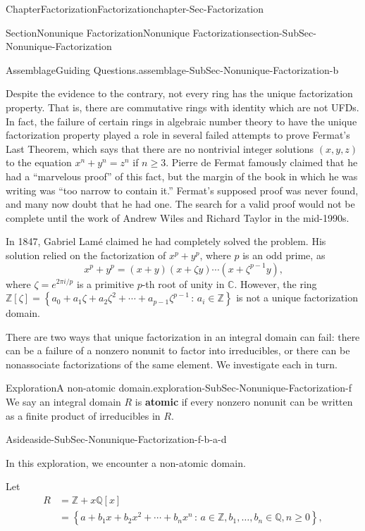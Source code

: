 \documentclass[oneside,10pt,]{book}
\newcommand{\terminology}[1]{\textbf{#1}}
\numberwithin{equation}{section}
\renewcommand{\ge}{\geqslant}
\newcommand{\setof}[2]{{\left\{#1\,\colon\,#2\right\}}}
\def\C{{\mathbb C}}
\def\Z{{\mathbb Z}}
\def\Q{{\mathbb Q}}
\newcommand{\amp}{&}
\begin{document}
\begin{chapterptx}{Chapter}{Factorization}{}{Factorization}{}{}{chapter-Sec-Factorization}
\begin{sectionptx}{Section}{Nonunique Factorization}{}{Nonunique Factorization}{}{}{section-SubSec-Nonunique-Factorization}
\begin{assemblage}{Assemblage}{Guiding Questions.}{assemblage-SubSec-Nonunique-Factorization-b}
\begin{itemize}[label=\textbullet]
\end{itemize}
%
\end{assemblage}
Despite the evidence to the contrary, not every ring has the unique factorization property. That is, there are commutative rings with identity which are not UFDs.  In fact, the failure of certain rings in algebraic number theory to have the unique factorization property played a role in several failed attempts to prove Fermat's Last Theorem, which says that there are no nontrivial integer solutions \((x,y,z)\) to the equation \(x^n + y^n = z^n\) if \(n \ge 3\). Pierre de Fermat famously claimed that he had a ``marvelous proof'' of this fact, but the margin of the book in which he was writing was ``too narrow to contain it.'' Fermat's supposed proof was never found, and many now doubt that he had one. The search for a valid proof would not be complete until the work of Andrew Wiles and Richard Taylor in the mid-1990s.%
\par
In 1847, Gabriel Lamé claimed he had completely solved the problem. His solution relied on the factorization of \(x^p + y^p\), where \(p\) is an odd prime, as%
\begin{equation*}
x^p + y^p = (x+y)(x+\zeta y) \cdots (x+\zeta^{p-1}y)\text{,}
\end{equation*}
where \(\zeta = e^{2\pi i/p}\) is a primitive \(p\)-th root of unity in \(\C\). However, the ring \(\Z[\zeta] = \setof{a_0 + a_1 \zeta + a_2 \zeta^2 + \cdots + a_{p-1} \zeta^{p-1}}{a_i\in\Z}\) is not a unique factorization domain.%
\par
There are two ways that unique factorization in an integral domain can fail: there can be a failure of a nonzero nonunit to factor into irreducibles, or there can be nonassociate factorizations of the same element. We investigate each in turn.%
\begin{exploration}{Exploration}{A non-atomic domain.}{exploration-SubSec-Nonunique-Factorization-f}%
We say an integral domain \(R\) is \terminology{atomic} if every nonzero nonunit can be written as a finite product of irreducibles in \(R\). \begin{aside}{Aside}{}{aside-SubSec-Nonunique-Factorization-f-b-a-d}%
\end{aside}
 In this exploration, we encounter a non-atomic domain.%
\par
Let%
\begin{align*}
R \amp = \Z + x\Q[x]\\
\amp = \setof{a + b_1 x + b_2 x^2 + \cdots + b_n x^n}{a\in \Z, b_1,\ldots, b_n \in \Q, n\ge 0},

\end{align*}
\end{exploration}
\end{sectionptx}
\end{chapterptx}
\end{document}
